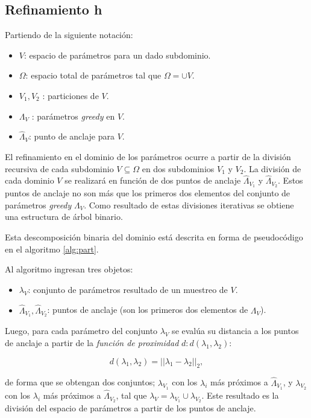 \subsection{Refinamiento h}

Partiendo de la siguiente notación:
\begin{itemize}
\item $V$: espacio de parámetros para un dado subdominio.
\item $\Omega$: espacio total de parámetros tal que $\Omega= \cup V$.
\item $V_1, V_2$ : particiones de $V$.
\item $\Lambda_V$ : parámetros \textit{greedy} en $V$.
\item  $\hat{\Lambda}_{V}$: punto de anclaje para $V$.
\end{itemize}

El refinamiento en el dominio de los parámetros ocurre a partir de la división recursiva de cada subdominio $V \subseteq \Omega$ en dos subdominios $V_1$ y $V_2$. La división de cada dominio $V$ se realizará en función de dos puntos de anclaje $\hat{\Lambda}_{V_1}$ y $\hat{\Lambda}_{V_2}$. Estos puntos de anclaje no son más que los primeros dos elementos del conjunto de parámetros \textit{greedy} $\Lambda_V$.
Como resultado de estas divisiones iterativas se obtiene una estructura de árbol binario.


Esta descomposición binaria del dominio está descrita en forma de pseudocódigo en el algoritmo \ref{alg:part}.

Al algoritmo ingresan tres objetos:

\begin{itemize}
\item $\lambda_V$: conjunto de parámetros resultado de un muestreo de $V$.
\item $\hat{\Lambda}_{V_1}, \hat{\Lambda}_{V_2}$: puntos de anclaje (son los primeros dos elementos de $\Lambda_V$).
\end{itemize}

Luego, para cada parámetro del conjunto $\lambda_V$ se evalúa su distancia a los puntos de anclaje a partir de la \textit{función de proximidad} $d: d(\lambda_1, \lambda_2)$:

\[
d(\lambda_1, \lambda_2) = ||\lambda_1 - \lambda_2||_2,
\]

de forma que se obtengan dos conjuntos; $\lambda_{V_1}$ con los $\lambda_{i}$ más próximos a $\hat{\Lambda}_{V_1}$, y $\lambda_{V_2}$ con los $\lambda_{i}$ más próximos a $\hat{\Lambda}_{V_2}$, tal que  $\lambda_{V} =\lambda_{V_1} \cup \lambda_{V_2}$. Este resultado es la división del espacio de parámetros a partir de los puntos de anclaje.

